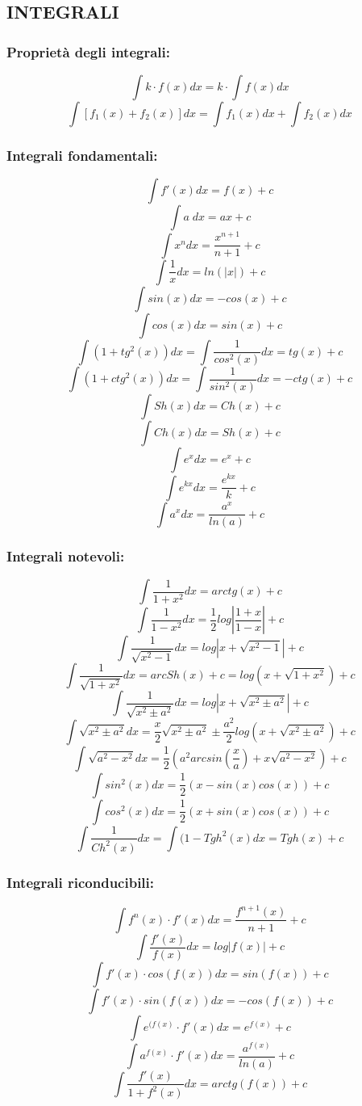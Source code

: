 \documentclass[a4paper, 9pt]{report}
\begin{document}
\subsection*{INTEGRALI}
\subsubsection*{Proprietà degli integrali:}
\[
    \int k \cdot f(x) dx = k \cdot \int f(x) dx
\]
\[
    \int [f_1(x) + f_2(x) ] dx= \int f_1(x) dx + \int f_2(x) dx
\]
\subsubsection*{Integrali fondamentali:}
\[
    \int f'(x) dx = f(x) +c
\]
\[
    \int a \; dx = ax +c
\]
\[
    \int x^n dx = \frac{x^{n+1}}{n+1} +c
\]
\[
    \int \frac{1}{x}dx = ln(|x|) +c
\]
\[
    \int sin(x) dx = -cos(x) +c
\]
\[
    \int cos(x) dx = sin(x)+c
\]
\[
    \int (1+tg^2(x))dx = \int \frac{1}{cos^2(x)} dx = tg(x) +c
\]
\[
    \int (1+ctg^2(x))dx = \int \frac{1}{sin^2(x)} dx = -ctg(x) +c
\]
\[
    \int Sh(x) dx = Ch(x) +c
\]
\[
    \int Ch(x) dx = Sh(x) +c
\]
\[
    \int e^x dx = e^x+c
\]
\[
    \int e^{kx} dx = \frac{e^{kx}}{k} +c
\]
\[
    \int a^x dx = \frac{a^x}{ln(a)}+c
\]
\subsubsection*{Integrali notevoli:}
\[
    \int \frac{1}{1+x^2} dx = arctg(x) +c
\]
\[
    \int \frac{1}{1-x^2} dx = \frac{1}{2}log\left|\frac{1+x}{1-x}\right|+c
\]
\[
    \int \frac{1}{\sqrt{x^2-1}} dx = log|x+ \sqrt{x^2-1}| +c
\]
\[
    \int \frac{1}{\sqrt{1+x^2}} dx = arcSh(x) +c = log(x + \sqrt{1+x^2}) +c
\]
\[
    \int \frac{1}{\sqrt{x^2 \pm a^2}} dx = log|x + \sqrt{x^2 \pm a^2}|+c
\]
\[
    \int \sqrt{x^2 \pm a^2} dx = \frac{x}{2} \sqrt{x^2 \pm a^2} \pm \frac{a^2}{2} log(x + \sqrt{x^2 \pm a^2}) +c
\]
\[
    \int \sqrt{a^2 - x^2}dx = \frac{1}{2}(a^2arcsin(\frac{x}{a}) + x \sqrt{a^2 - x^2} )+c
\]
\[
    \int sin^2(x) dx = \frac{1}{2}(x-sin(x)cos(x)) +c
\]
\[
    \int cos^2(x) dx = \frac{1}{2}(x+sin(x)cos(x)) +c
\]
\[
    \int \frac{1}{Ch^2(x)} dx = \int (1-Tgh^2(x)dx= Tgh(x)+c
\]
\subsubsection*{Integrali riconducibili:}
\[
    \int f^n(x) \cdot f'(x) dx = \frac{f^{n+1}(x)}{n+1} +c
\]
\[
    \int \frac{f'(x)}{f(x)} dx = log|f(x)|+c
\]
\[
    \int f'(x) \cdot cos(f(x)) dx =  sin(f(x))+c
\]
\[
    \int f'(x) \cdot sin(f(x)) dx = -cos(f(x)) +c
\]
\[
    \int e^{(f(x)} \cdot f'(x) dx = e^{f(x)}+c
\]
\[
    \int a^{f(x)} \cdot f'(x) dx = \frac{a^{f(x)}}{ln(a)} +c
\]
\[
    \int \frac{f'(x)}{1+f^2(x)} dx = arctg(f(x))+c
\]
\end{document}
